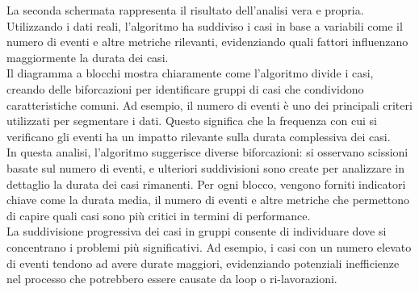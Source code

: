 \documentclass{article}
\begin{document}
La seconda schermata rappresenta il risultato dell'analisi vera e propria. Utilizzando i dati reali, l'algoritmo ha suddiviso i casi in base a variabili come il numero di eventi e altre metriche rilevanti, evidenziando quali fattori influenzano maggiormente la durata dei casi.\\
Il diagramma a blocchi mostra chiaramente come l'algoritmo divide i casi, creando delle biforcazioni per identificare gruppi di casi che condividono caratteristiche comuni. Ad esempio, il numero di eventi è uno dei principali criteri utilizzati per segmentare i dati. Questo significa che la frequenza con cui si verificano gli eventi ha un impatto rilevante sulla durata complessiva dei casi.\\
In questa analisi, l'algoritmo suggerisce diverse biforcazioni: si osservano scissioni basate sul numero di eventi, e ulteriori suddivisioni sono create per analizzare in dettaglio la durata dei casi rimanenti. Per ogni blocco, vengono forniti indicatori chiave come la durata media, il numero di eventi e altre metriche che permettono di capire quali casi sono più critici in termini di performance.\\
La suddivisione progressiva dei casi in gruppi consente di individuare dove si concentrano i problemi più significativi. Ad esempio, i casi con un numero elevato di eventi tendono ad avere durate maggiori, evidenziando potenziali inefficienze nel processo che potrebbero essere causate da loop o ri-lavorazioni.
\end{document}
